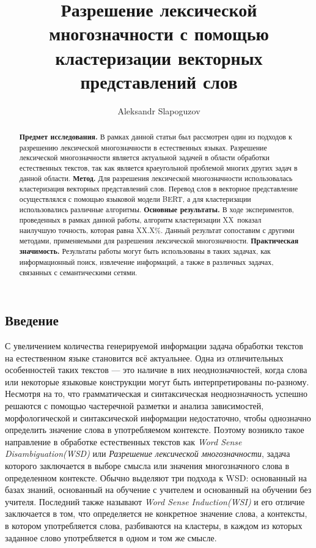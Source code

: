 \documentclass[12pt]{article}
\title{Разрешение лексической многозначности с помощью кластеризации векторных представлений слов}
\author{Aleksandr Slapoguzov}
\begin{document}
    \maketitle
    \begin{abstract}
        \textbf{Предмет исследования.} В рамках данной статьи был рассмотрен один из подходов к разрешению
        лексической многозначности в естественных языках.
        Разрешение лексической многозначности является актуальной задачей в области обработки естественных текстов,
        так как является краеугольной проблемой многих других задач в данной области.
        \textbf{Метод.} Для разрешения лексической многозначности использовалась
        кластеризация векторных представлений слов.
        Перевод слов в векторное представление осуществлялся с помощью языковой модели BERT, а для кластеризации
        использовались различные алгоритмы.
        \textbf{Основные результаты.} В ходе экспериментов, проведенных в рамках данной работы,
        алгоритм кластеризации XX\ показал наилучшую точность, которая равна XX.X\%.
        Данный результат сопоставим с другими методами, применяемыми для разрешения лексической многозначности.
        \textbf{Практическая значимость.} Результаты работы могут быть использованы в таких задачах, как информационный
        поиск, извлечение информаций, а также в различных задачах, связанных с семантическими сетями.
    \end{abstract}
    \begin{multicols}{2}
        \section*{Введение}\label{sec:intro}
        С увеличением количества генерируемой информации задача обработки текстов на естественном языке становится всё
        актуальнее.
        Одна из отличительных особенностей таких текстов — это наличие в них неоднозначностей, когда слова
        или некоторые языковые конструкции могут быть интерпретированы по-разному.
        Несмотря на то, что грамматическая и синтаксическая неоднозначность успешно решаются с помощью
        частеречной разметки и анализа зависимостей, морфологической и синтаксической информации недостаточно, чтобы
        однозначно определить значение слова в употребляемом контексте.
        Поэтому возникло такое направление в обработке естественных текстов как \textit{Word Sense Disambiguation(WSD)}
        или \textit{Разрешение лексической многозначности}, задача которого заключается в выборе смысла или значения
        многозначного слова в определенном контексте.
        Обычно выделяют три подхода к WSD: основанный на базах знаний, основанный на обучение с учителем и
        основанный на обучении без учителя. Последний также называют \textit{Word Sense Induction(WSI)} и его отличие
        заключается в том, что определяется не конкретное значение слова, а контексты, в котором употребляется слова,
        разбиваются на кластеры, в каждом из которых заданное слово употребляется в одном и том же смысле.


    \end{multicols}
\end{document}
